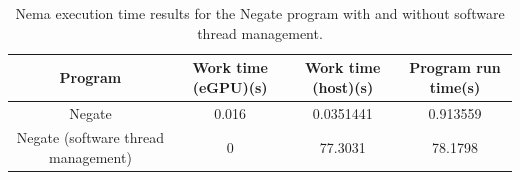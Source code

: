 \begin{table}[!htbp]
\centering
\begin{tabular}{@{}|c|c|c|c|@{}}
\toprule
\textbf{Program}                  & \textbf{Work time (eGPU)(s)} & \textbf{Work time (host)(s)} & \textbf{Program run time(s)} \\ \midrule
Negate & 0.016                             & 0.0351441                       & 0.913559                     \\ \midrule
Negate (software thread management) & 0                                 & 77.3031                         & 78.1798                      \\ \bottomrule
\end{tabular}
\caption{Nema execution time results for the Negate program with and without software thread management.}
\label{tab:nemartneg}
\end{table}